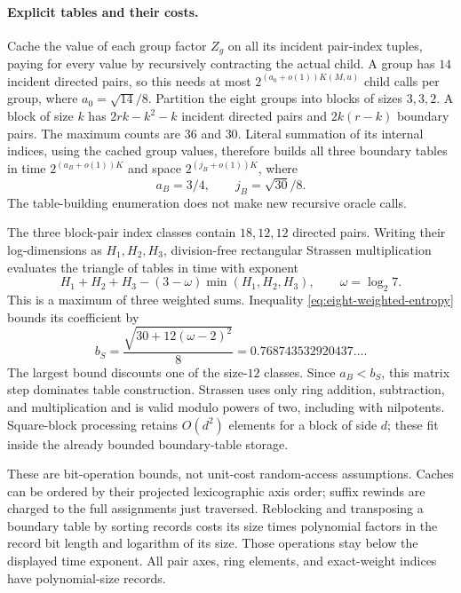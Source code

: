 \paragraph{Explicit tables and their costs.}
Cache the value of each group factor $Z_g$ on all its incident pair-index
tuples, paying for every value by recursively contracting the actual child.
A group has $14$ incident directed pairs, so this needs at most
$2^{(a_0+o(1))K(M,u)}$ child calls per group, where
$a_0=\sqrt{14}/8$.
Partition the eight groups into blocks of sizes $3,3,2$.
A block of size $k$ has $2rk-k^2-k$ incident directed pairs and
$2k(r-k)$ boundary pairs.  The maximum counts are $36$ and $30$.
Literal summation of its internal indices, using the cached group values,
therefore builds all three boundary tables in time
$2^{(a_B+o(1))K}$ and space $2^{(j_B+o(1))K}$, where
\[
 a_B=3/4,\qquad j_B=\sqrt{30}/8.
\]
The table-building enumeration does not make new recursive oracle calls.

The three block-pair index classes contain $18,12,12$ directed pairs.
Writing their log-dimensions as $H_1,H_2,H_3$, division-free rectangular
Strassen multiplication evaluates the triangle of tables in time with
exponent
\[
 H_1+H_2+H_3-(3-\omega)\min(H_1,H_2,H_3),\qquad\omega=\log_2 7.
\]
This is a maximum of three weighted sums.  Inequality
\eqref{eq:eight-weighted-entropy} bounds its coefficient by
\[
 b_S=\frac{\sqrt{30+12(\omega-2)^2}}8
     =0.768743532920437\ldots.
\]
The largest bound discounts one of the size-$12$ classes.
Since $a_B<b_S$, this matrix step dominates table construction.
Strassen uses only ring addition, subtraction, and multiplication and
is valid modulo powers of two, including with nilpotents.
Square-block processing retains $O(d^2)$ elements for a block of side $d$;
these fit inside the already bounded boundary-table storage.

These are bit-operation bounds, not unit-cost random-access assumptions.
Caches can be ordered by their projected lexicographic axis order; suffix
rewinds are charged to the full assignments just traversed.  Reblocking
and transposing a boundary table by sorting records costs its size times
polynomial factors in the record bit length and logarithm of its size.
Those operations stay below the displayed time exponent.  All pair axes,
ring elements, and exact-weight indices have polynomial-size records.

